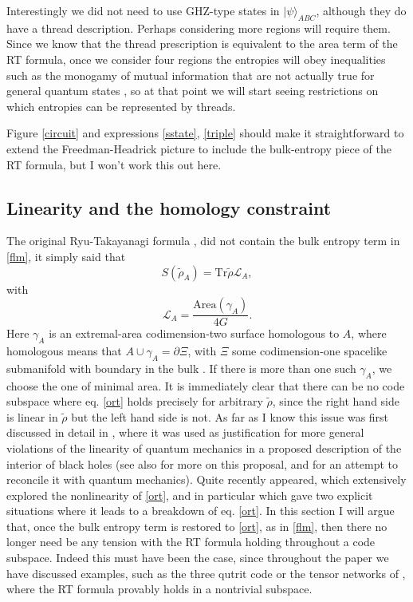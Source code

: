 \documentclass[12pt]{article}
\newcommand{\be}{\begin{equation}}
\newcommand{\ee}{\end{equation}}
\newcommand{\ran}{\rangle}
\newcommand{\Tr}{\mathrm{Tr}}
\newcommand{\wt}{\widetilde}
\newcommand{\Ll}{\mathcal{L}}
\newcommand{\LA}{\Ll_A}
\begin{document}
Interestingly we did not need to use GHZ-type states in $|\psi\ran_{ABC}$, although they do have a thread description.  Perhaps considering more regions will require them.  Since we know that the thread prescription is equivalent to the area term of the RT formula, once we consider four regions the entropies will obey inequalities such as the monogamy of mutual information that are not actually true for general quantum states \cite{Hayden:2011ag,Bao:2015bfa}, so at that point we will start seeing restrictions on which entropies can be represented by threads.   

Figure \ref{circuit} and expressions \eqref{sstate}, \eqref{triple} should make it straightforward to extend the Freedman-Headrick picture to include the bulk-entropy piece of the RT formula, but I won't work this out here.  



\subsection{Linearity and the homology constraint}
The original Ryu-Takayanagi formula \cite{Ryu:2006bv}, \cite{Hubeny:2007xt,Lewkowycz:2013nqa} did not contain the bulk entropy term in \eqref{flm}, it simply said that 
\be\label{ort}
S(\wt{\rho}_A)=\Tr \wt{\rho}\LA,
\ee
with 
\be
\LA=\frac{\mathrm{Area}(\gamma_A)}{4G}.
\ee
Here $\gamma_A$ is an extremal-area codimension-two surface homologous to $A$, where homologous means that $A\cup \gamma_A=\partial \Xi$, with $\Xi$ some codimension-one spacelike submanifold with boundary in the bulk \cite{Headrick:2007km,Haehl:2014zoa}.  If there is more than one such $\gamma_A$, we choose the one of minimal area.  It is immediately clear that there can be no code subspace where eq. \eqref{ort} holds precisely for arbitrary $\wt{\rho}$, since the right hand side is linear in $\wt{\rho}$ but the left hand side is not.  As far as I know this issue was first discussed in detail in \cite{Papadodimas:2015jra}, where it was used as justification for more general violations of the linearity of quantum mechanics in a proposed description of the interior of black holes (see also \cite{Harlow:2014yoa,Marolf:2015dia} for more on this proposal, and \cite{Raju:2016vsu} for an attempt to reconcile it with quantum mechanics).  Quite recently \cite{Almheiri:2016blp} appeared, which extensively explored the nonlinearity of \eqref{ort}, and in particular which gave two explicit situations where it leads to a breakdown of eq. \eqref{ort}.  In this section I will argue that, once the bulk entropy term is restored to \eqref{ort}, as in \eqref{flm}, then there no longer need be any tension with the RT formula holding throughout a code subspace.  Indeed this must have been the case, since throughout the paper we have discussed examples, such as the three qutrit code or the tensor networks of \cite{Pastawski:2015qua,Hayden:2016cfa}, where the RT formula provably holds in a nontrivial subspace.  
\end{document}

